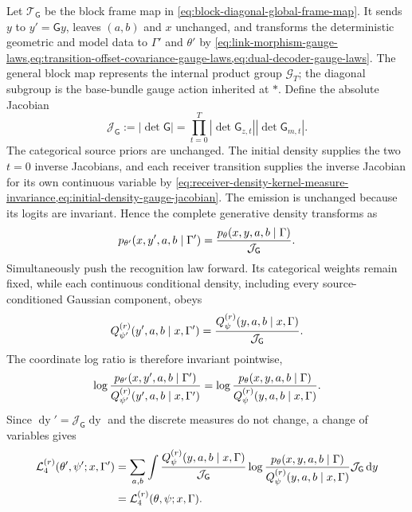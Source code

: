 Let $\mathcal T_{\mathsf G}$ be the block frame map in \cref{eq:block-diagonal-global-frame-map}. It sends $y$ to $y'=\mathsf G y$, leaves $(a,b)$ and $x$ unchanged, and transforms the deterministic geometric and model data to $\Gamma'$ and $\theta'$ by \cref{eq:link-morphism-gauge-laws,eq:transition-offset-covariance-gauge-laws,eq:dual-decoder-gauge-laws}. The general block map represents the internal product group $\mathcal G_T$; the diagonal subgroup is the base-bundle gauge action inherited at $\ast$. Define the absolute Jacobian
\begin{equation}
\mathcal J_{\mathsf G}
:=|\det\mathsf G|
=\prod_{t=0}^{T}
|\det\mathsf G_{z,t}|
|\det\mathsf G_{m,t}|.
\label{eq:global-frame-jacobian}
\end{equation}
The categorical source priors are unchanged. The initial density supplies the two $t=0$ inverse Jacobians, and each receiver transition supplies the inverse Jacobian for its own continuous variable by \cref{eq:receiver-density-kernel-measure-invariance,eq:initial-density-gauge-jacobian}. The emission is unchanged because its logits are invariant. Hence the complete generative density transforms as
\begin{equation}
p_{\theta'}(x,y',a,b\mid\Gamma')
=\frac{p_\theta(x,y,a,b\mid\Gamma)}
{\mathcal J_{\mathsf G}}.
\label{eq:complete-generative-density-pushforward}
\end{equation}
Simultaneously push the recognition law forward. Its categorical weights remain fixed, while each continuous conditional density, including every source-conditioned Gaussian component, obeys
\begin{equation}
Q_{\psi'}^{(r)}(y',a,b\mid x,\Gamma')
=\frac{Q_\psi^{(r)}(y,a,b\mid x,\Gamma)}
{\mathcal J_{\mathsf G}}.
\label{eq:complete-recognition-density-pushforward}
\end{equation}
The coordinate log ratio is therefore invariant pointwise,
\begin{equation}
\log\frac{p_{\theta'}(x,y',a,b\mid\Gamma')}
{Q_{\psi'}^{(r)}(y',a,b\mid x,\Gamma')}
=\log\frac{p_\theta(x,y,a,b\mid\Gamma)}
{Q_\psi^{(r)}(y,a,b\mid x,\Gamma)}.
\label{eq:complete-elbo-log-ratio-invariance}
\end{equation}
Since $\mathop{\mathrm dy}'=\mathcal J_{\mathsf G}\mathop{\mathrm dy}$ and the discrete measures do not change, a change of variables gives
\begin{equation}
\begin{aligned}
\mathcal L_4^{(r)}(\theta',\psi';x,\Gamma')
&=\sum_{a,b}\int
\frac{Q_\psi^{(r)}(y,a,b\mid x,\Gamma)}
{\mathcal J_{\mathsf G}}
\log\frac{p_\theta(x,y,a,b\mid\Gamma)}
{Q_\psi^{(r)}(y,a,b\mid x,\Gamma)}
\mathcal J_{\mathsf G}\mathop{\mathrm dy}\\
&=\mathcal L_4^{(r)}(\theta,\psi;x,\Gamma).
\end{aligned}
\label{eq:complete-elbo-gauge-invariance}
\end{equation}
